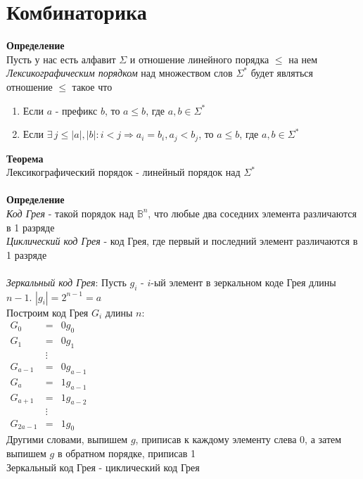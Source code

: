 \documentclass[12pt]{article}
\begin{document}
\section{Комбинаторика}
\textbf{Определение}\\
Пусть у нас есть алфавит $\Sigma$ и отношение линейного порядка $\leq$ на нем\\
\textit{Лексикографическим порядком} над множеством слов $\Sigma^*$ будет являться отношение $\leq$ такое что
\begin{enumerate}
    \item Если $a$ - префикс $b$, то $a \leq b$, где $a,b \in \Sigma^*$
    \item Если $\exists\,j \leq |a|,|b|: i < j \Rightarrow a_i = b_i, a_j < b_j$, то $a \leq b$, где $a,b \in \Sigma^*$
\end{enumerate}
\textbf{Теорема}\\
Лексикографический порядок - линейный порядок над $\Sigma^*$\\\\
\textbf{Определение}\\
\textit{Код Грея} - такой порядок над $\mathbb{B}^n$, что любые два соседних элемента различаются в 1 разряде\\
\textit{Циклический код Грея} - код Грея, где первый и последний элемент различаются в 1 разряде\\\\
\textit{Зеркальный код Грея}:
Пусть $g_i$ - $i$-ый элемент в зеркальном коде Грея длины $n-1$. $|g_i| = 2^{n-1} = a$\\
Построим код Грея $G_i$ длины $n$:\\
$\begin{array}{ccc}
     G_0 & = & 0g_0 \\
     G_1 & = & 0g_1\\
     &\vdots&\\
     G_{a-1} & = & 0g_{a-1}\\
     G_a & = & 1g_{a-1}\\
     G_{a+1} & = & 1g_{a-2}\\
     &\vdots&\\
     G_{2a-1} & = & 1g_0
\end{array}$\\
Другими словами, выпишем $g$, приписав к каждому элементу слева 0, а затем выпишем $g$ в обратном порядке, приписав 1\\
Зеркальный код Грея - циклический код Грея\\\\
\end{document}
